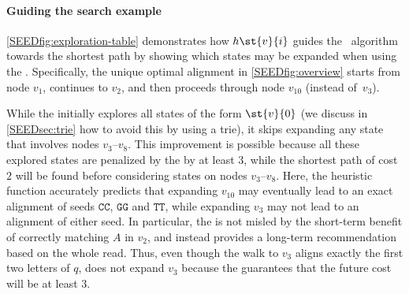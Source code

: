 

\paragraph{Guiding the search example}
%
\cref{SEEDfig:exploration-table} demonstrates how $h\st{v}{i}$ guides the
\A~algorithm towards the shortest path by showing which states may be
\colorbox{pink-highlight}{expanded} when using the \seedh.
%
Specifically, the unique optimal alignment in \cref{SEEDfig:overview} starts from
node $v_{1}$, continues to $v_{2}$, and then proceeds through node $v_{10}$
(instead of~$v_{3}$).

While the \seedh initially explores all states of the form $\st{v}{0}$ (we
discuss in \cref{SEEDsec:trie} how to avoid this by using a trie), it skips
expanding any state that involves nodes $v_{3}$--$v_{8}$. This improvement is
possible because all these explored states are penalized by the \seedh by at
least $3$, while the shortest path of cost $2$ will be found before considering
states on nodes $v_{3}$--$v_{8}$.
%
Here, the heuristic function accurately predicts that expanding $v_{10}$ may
eventually lead to an exact alignment of seeds
\colorbox{light-yellow}{$\mathtt{CC}$}, \colorbox{light-violet}{$\mathtt{GG}$}
and \colorbox{light-green}{$\mathtt{TT}$}, while expanding $v_3$ may not lead to
an alignment of either seed.
%
In particular, the \seedh is not misled by the short-term benefit of correctly
matching $A$ in $v_{2}$, and instead provides a long-term recommendation based
on the whole read. Thus, even though the walk to $v_{3}$ aligns exactly the
first two letters of $q$, \A does not expand $v_{3}$ because the \seedh
guarantees that the future cost will be at least $3$.

